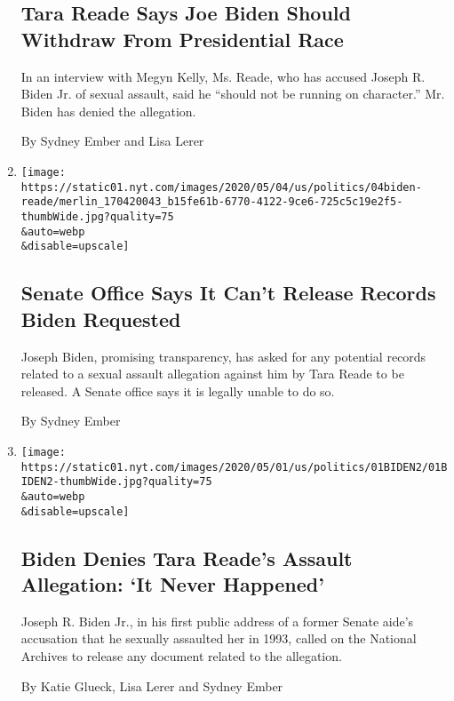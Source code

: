 \begin{enumerate}
  \hypertarget{tara-reade-says-joe-biden-should-withdraw-from-presidential-race}{%
  \subsection{Tara Reade Says Joe Biden Should Withdraw From
  Presidential
  Race}\label{tara-reade-says-joe-biden-should-withdraw-from-presidential-race}}

  In an interview with Megyn Kelly, Ms. Reade, who has accused Joseph R.
  Biden Jr. of sexual assault, said he ``should not be running on
  character.'' Mr. Biden has denied the allegation.

  By Sydney Ember and Lisa Lerer
\item
  \href{/2020/05/04/us/politics/joe-biden-tara-reade-sexual-assault.html}{}

  \texttt{[image: https://static01.nyt.com/images/2020/05/04/us/politics/04biden-reade/merlin\_170420043\_b15fe61b-6770-4122-9ce6-725c5c19e2f5-thumbWide.jpg?quality=75\\\&auto=webp\\\&disable=upscale]}

  \hypertarget{senate-office-says-it-cant-release-records-biden-requested}{%
  \subsection{Senate Office Says It Can't Release Records Biden
  Requested}\label{senate-office-says-it-cant-release-records-biden-requested}}

  Joseph Biden, promising transparency, has asked for any potential
  records related to a sexual assault allegation against him by Tara
  Reade to be released. A Senate office says it is legally unable to do
  so.

  By Sydney Ember
\item
  \href{/2020/05/01/us/politics/joe-biden-tara-reade-morning-joe.html}{}

  \texttt{[image: https://static01.nyt.com/images/2020/05/01/us/politics/01BIDEN2/01BIDEN2-thumbWide.jpg?quality=75\\\&auto=webp\\\&disable=upscale]}

  \hypertarget{biden-denies-tara-reades-assault-allegation-it-never-happened}{%
  \subsection{Biden Denies Tara Reade's Assault Allegation: `It Never
  Happened'}\label{biden-denies-tara-reades-assault-allegation-it-never-happened}}

  Joseph R. Biden Jr., in his first public address of a former Senate
  aide's accusation that he sexually assaulted her in 1993, called on
  the National Archives to release any document related to the
  allegation.

  By Katie Glueck, Lisa Lerer and Sydney Ember
\end{enumerate}


